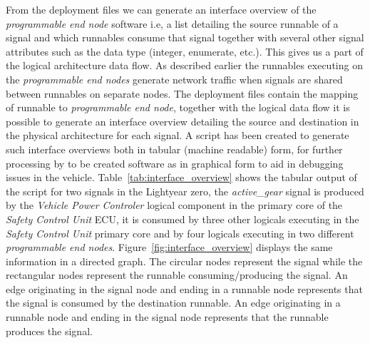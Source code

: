 From the deployment files we can generate an interface overview of the \textit{programmable end node} software i.e, a list detailing the source runnable of a signal and which runnables consume that signal together with several other signal attributes such as the data type (integer, enumerate, etc.). This gives us a part of the logical architecture data flow. As described earlier the runnables executing on the \textit{programmable end nodes} generate network traffic when signals are shared between runnables on separate nodes. The deployment files contain the mapping of runnable to \textit{programmable end node}, together with the logical data flow it is possible to generate an interface overview detailing the source and destination in the physical architecture for each signal. A script has been created to generate such interface overviews both in tabular (machine readable) form, for further processing by to be created software as in graphical form to aid in debugging issues in the vehicle. Table~\ref{tab:interface_overview} shows the tabular output of the script for two signals in the Lightyear zero, the \textit{active\_gear} signal is produced by the \textit{Vehicle Power Controler} logical component in the primary core of the \textit{Safety Control Unit} ECU, it is consumed by three other logicals executing in the \textit{Safety Control Unit} primary core and by four logicals executing in two different \textit{programmable end nodes}. Figure~\ref{fig:interface_overview} displays the same information in a directed graph. The circular nodes represent the signal while the rectangular nodes represent the runnable consuming/producing the signal. An edge originating in the signal node and ending in a runnable node represents that the signal is consumed by the destination runnable. An edge originating in a runnable node and ending in the signal node represents that the runnable produces the signal.

